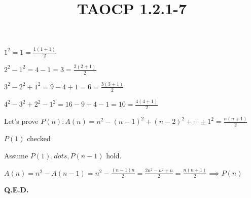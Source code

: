 \documentclass{article}
\title{TAOCP 1.2.1\mbox{-}7}
\begin{document}
\maketitle

\( 1^{2} = 1 = \frac{1(1+1)}{2} \)

\( 2^{2} - 1^{2} = 4-1=3=\frac{2(2+1)}{2} \)

\( 3^{2}-2^{2}+1^{2}=9-4+1=6=\frac{3(3+1)}{2} \)

\( 4^{2}-3^{2}+2^{2}-1^{2}=16-9+4-1=10=\frac{4(4+1)}{2} \)

Let's prove \( P(n): A(n) = n^{2} - {(n-1)}^{2} + {(n-2)}^{2} + \cdots \pm 1^{2} = \frac{n(n+1)}{2} \)

\( P(1) \) checked

Assume \( P(1), dots, P(n-1) \) hold.

\( A(n) = n^{2} - A(n-1) =n^{2} - \frac{(n-1)n}{2}=\frac{2n^{2}-n^{2}+n}{2}=\frac{n(n+1)}{2} \implies P(n) \)

\textbf{Q.E.D.}
\end{document}

